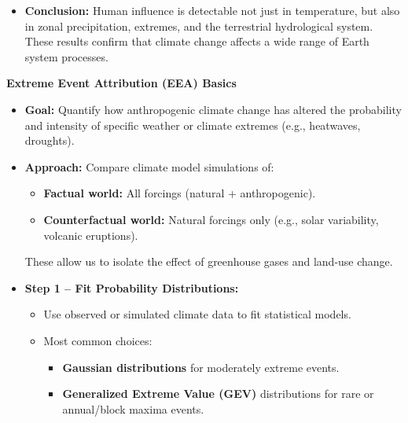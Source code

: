 \documentclass[fontsize=8pt, a4paper, landscape, fleqn]{scrartcl}
\renewcommand{\subsection}[1]{%
    \noindent\colorbox{subsectioncolor}{%
        \parbox{\dimexpr\columnwidth-2\fboxsep}{\color{white}\textbf{#1}}}%
    \vspace{0.5mm}%
}
\begin{document}
\begin{multicols*}{3}[\raggedcolumns]
\begin{itemize}
    \item \textbf{Conclusion:} Human influence is detectable not just in temperature, but also in zonal precipitation, extremes, and the terrestrial hydrological system. These results confirm that climate change affects a wide range of Earth system processes.
\end{itemize}

\subsection{Extreme Event Attribution (EEA) Basics}

\begin{itemize}
    \item \textbf{Goal:} Quantify how anthropogenic climate change has altered the probability and intensity of specific weather or climate extremes (e.g., heatwaves, droughts).

    \item \textbf{Approach:} Compare climate model simulations of:
    \begin{itemize}
        \item \textbf{Factual world:} All forcings (natural + anthropogenic).
        \item \textbf{Counterfactual world:} Natural forcings only (e.g., solar variability, volcanic eruptions).
    \end{itemize}
    These allow us to isolate the effect of greenhouse gases and land-use change.

    \item \textbf{Step 1 – Fit Probability Distributions:}
    \begin{itemize}
        \item Use observed or simulated climate data to fit statistical models.
        \item Most common choices:
        \begin{itemize}
            \item \textbf{Gaussian distributions} for moderately extreme events.
            \item \textbf{Generalized Extreme Value (GEV)} distributions for rare or annual/block maxima events.
        \end{itemize}
    \end{itemize}


\end{itemize}
\end{multicols*}
\end{document}
